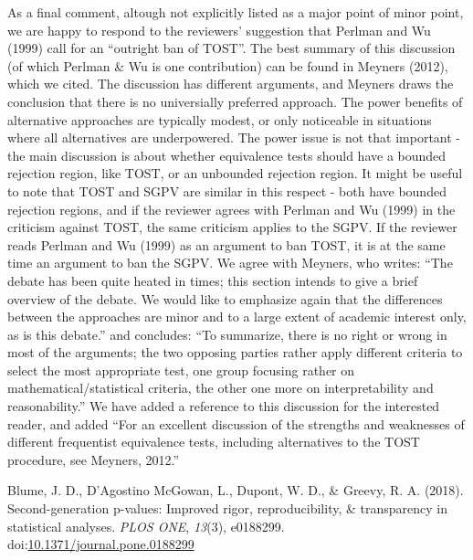 \documentclass[man]{apa6}
\begin{document}
As a final comment, altough not explicitly listed as a major point of
minor point, we are happy to respond to the reviewers' suggestion that
Perlman and Wu (1999) call for an \enquote{outright ban of TOST}. The
best summary of this discussion (of which Perlman \& Wu is one
contribution) can be found in Meyners (2012), which we cited. The
discussion has different arguments, and Meyners draws the conclusion
that there is no universially preferred approach. The power benefits of
alternative approaches are typically modest, or only noticeable in
situations where all alternatives are underpowered. The power issue is
not that important - the main discussion is about whether equivalence
tests should have a bounded rejection region, like TOST, or an unbounded
rejection region. It might be useful to note that TOST and SGPV are
similar in this respect - both have bounded rejection regions, and if
the reviewer agrees with Perlman and Wu (1999) in the criticism against
TOST, the same criticism applies to the SGPV. If the reviewer reads
Perlman and Wu (1999) as an argument to ban TOST, it is at the same time
an argument to ban the SGPV. We agree with Meyners, who writes:
\enquote{The debate has been quite heated in times; this section intends
to give a brief overview of the debate. We would like to emphasize again
that the differences between the approaches are minor and to a large
extent of academic interest only, as is this debate.} and concludes:
\enquote{To summarize, there is no right or wrong in most of the
arguments; the two opposing parties rather apply different criteria to
select the most appropriate test, one group focusing rather on
mathematical/statistical criteria, the other one more on
interpretability and reasonability.} We have added a reference to this
discussion for the interested reader, and added \enquote{For an
excellent discussion of the strengths and weaknesses of different
frequentist equivalence tests, including alternatives to the TOST
procedure, see Meyners, 2012.}

\begingroup
\setlength{\parindent}{-0.5in} \setlength{\leftskip}{0.5in}

\hypertarget{refs}{}
\hypertarget{ref-blume_second-generation_2018}{}
Blume, J. D., D'Agostino McGowan, L., Dupont, W. D., \& Greevy, R. A.
(2018). Second-generation p-values: Improved rigor, reproducibility, \&
transparency in statistical analyses. \emph{PLOS ONE}, \emph{13}(3),
e0188299.
doi:\href{https://doi.org/10.1371/journal.pone.0188299}{10.1371/journal.pone.0188299}

\endgroup
\end{document}
